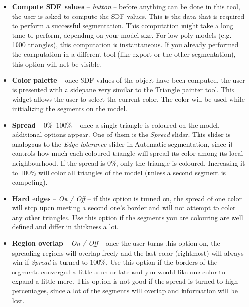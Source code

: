 \begin{itemize}

\item \textbf{Compute SDF values} -- \textit{button} -- before anything can be done in this tool, the user is asked to compute the SDF values. This is the data that is required to perform a successful segmentation. This computation might take a long time to perform, depending on your model size. For low-poly models (e.g. 1000 triangles), this computation is instantaneous. If you already performed the computation in a different tool (like export or the other segmentation), this option will not be visible.

\item \textbf{Color palette} -- once SDF values of the object have been computed, the user is presented with a sidepane very similar to the Triangle painter tool. This widget allows the user to select the current color. The color will be used while initializing the segments on the model.

\item \textbf{Spread} -- $0\%$--$100\%$ -- once a single triangle is coloured on the model, additional options appear. One of them is the \textit{Spread} slider. This slider is analogous to the \textit{Edge tolerance} slider in Automatic segmentation, since it controls how much each coloured triangle will spread its color among its local neighbourhood. If the spread is $0\%$, only the triangle is coloured. Increasing it to $100\%$ will color all triangles of the model (unless a second segment is competing).

\item \textbf{Hard edges} -- \textit{On / Off} -- if this option is turned on, the spread of one color will stop upon meeting a second one's border and will not attempt to color any other triangles. Use this option if the segments you are colouring are well defined and differ in thickness a lot.

\item \textbf{Region overlap} -- \textit{On / Off} -- once the user turns this option on, the spreading regions will overlap freely and the last color (rightmost) will always win if \textit{Spread} is turned to $100\%$. Use this option if the borders of the segments converged a little soon or late and you would like one color to expand a little more. This option is not good if the spread is turned to high percentages, since a lot of the segments will overlap and information will be lost.

\end{itemize}

